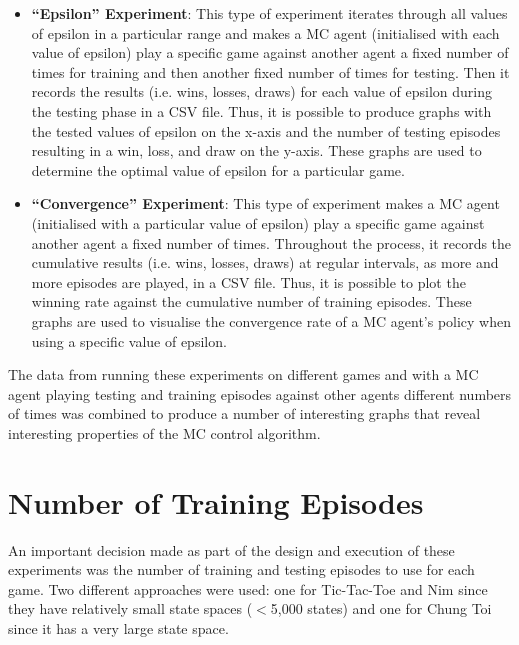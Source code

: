 \documentclass[11pt,a4paper]{report}
\begin{document}
\begin{itemize}

	\item \textbf{``Epsilon'' Experiment}: This type of experiment iterates through all values of epsilon in a particular range and makes a MC agent (initialised with each value of epsilon) play a specific game against another agent a fixed number of times for training and then another fixed number of times for testing. Then it records the results (i.e. wins, losses, draws) for each value of epsilon during the testing phase in a CSV file. Thus, it is possible to produce graphs with the tested values of epsilon on the x-axis and the number of testing episodes resulting in a win, loss, and draw on the y-axis. These graphs are used to determine the optimal value of epsilon for a particular game.

	\item \textbf{``Convergence'' Experiment}: This type of experiment makes a MC agent (initialised with a particular value of epsilon) play a specific game against another agent a fixed number of times. Throughout the process, it records the cumulative results (i.e. wins, losses, draws) at regular intervals, as more and more episodes are played, in a CSV file. Thus, it is possible to plot the winning rate against the cumulative number of training episodes. These graphs are used to visualise the convergence rate of a MC agent's policy when using a specific value of epsilon.

\end{itemize}

The data from running these experiments on different games and with a MC agent playing testing and training episodes against other agents different numbers of times was combined to produce a number of interesting graphs that reveal interesting properties of the MC control algorithm.


\section{Number of Training Episodes}

An important decision made as part of the design and execution of these experiments was the number of training and testing episodes to use for each game. Two different approaches were used: one for Tic-Tac-Toe and Nim since they have relatively small state spaces ($<$5,000 states) and one for Chung Toi since it has a very large state space.
\end{document}
